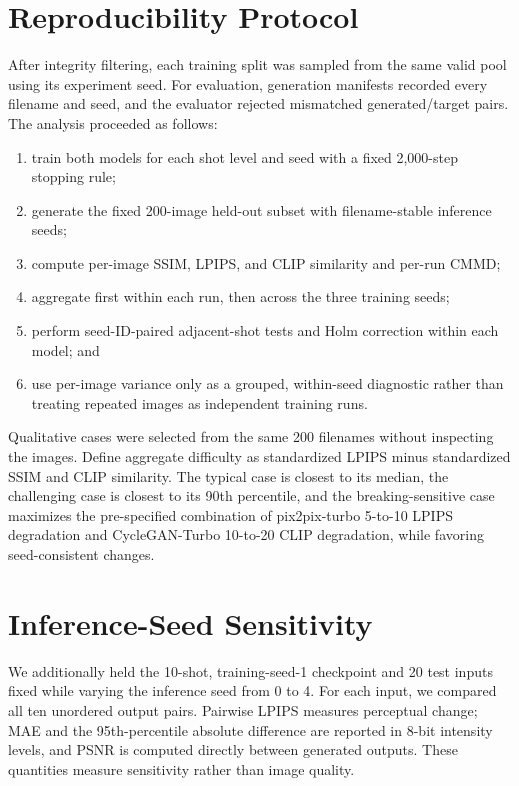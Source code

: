 \documentclass{article}
\begin{document}
\section{Reproducibility Protocol}

After integrity filtering, each training split was sampled from the same valid pool using its experiment seed. For evaluation, generation manifests recorded every filename and seed, and the evaluator rejected mismatched generated/target pairs. The analysis proceeded as follows:
\begin{enumerate}
  \item train both models for each shot level and seed with a fixed 2,000-step stopping rule;
  \item generate the fixed 200-image held-out subset with filename-stable inference seeds;
  \item compute per-image SSIM, LPIPS, and CLIP similarity and per-run CMMD;
  \item aggregate first within each run, then across the three training seeds;
  \item perform seed-ID-paired adjacent-shot tests and Holm correction within each model; and
  \item use per-image variance only as a grouped, within-seed diagnostic rather than treating repeated images as independent training runs.
\end{enumerate}

Qualitative cases were selected from the same 200 filenames without inspecting the images. Define aggregate difficulty as standardized LPIPS minus standardized SSIM and CLIP similarity. The typical case is closest to its median, the challenging case is closest to its 90th percentile, and the breaking-sensitive case maximizes the pre-specified combination of pix2pix-turbo 5-to-10 LPIPS degradation and CycleGAN-Turbo 10-to-20 CLIP degradation, while favoring seed-consistent changes.

\clearpage
\section{Inference-Seed Sensitivity}
\label{app:inference-variability}

We additionally held the 10-shot, training-seed-1 checkpoint and 20 test inputs fixed while varying the inference seed from 0 to 4. For each input, we compared all ten unordered output pairs. Pairwise LPIPS measures perceptual change; MAE and the 95th-percentile absolute difference are reported in 8-bit intensity levels, and PSNR is computed directly between generated outputs. These quantities measure sensitivity rather than image quality.
\end{document}
